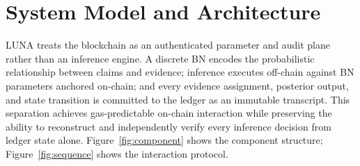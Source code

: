 \documentclass[journal]{IEEEtran}
\begin{document}
\begin{table}[t]
\centering
\caption{Comparison of oracle designs along inference,
accountability, and gas cost dimensions.}
\label{tab:oracle-comparison}
\end{table}


\section{System Model and Architecture}
\label{sec:proposed-methodology}

LUNA treats the blockchain as an authenticated parameter
and audit plane rather than an inference engine.
A discrete BN encodes the probabilistic relationship
between claims and evidence; inference executes off-chain
against BN parameters anchored on-chain; and every
evidence assignment, posterior output, and state
transition is committed to the ledger as an immutable
transcript.
This separation achieves gas-predictable on-chain
interaction while preserving the ability to reconstruct
and independently verify every inference decision from
ledger state alone.
Figure~\ref{fig:component} shows the component structure;
Figure~\ref{fig:sequence} shows the interaction protocol.
\end{document}
